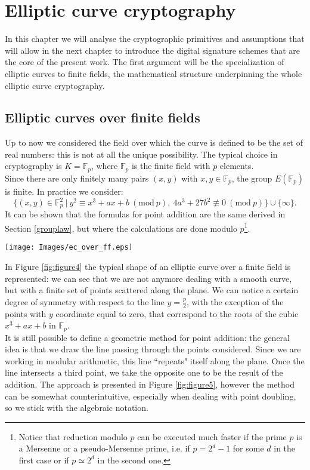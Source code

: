 \chapter{Elliptic curve cryptography}
\label{chpr:ecc}
In this chapter we will analyse the cryptographic primitives and assumptions that will allow in the next chapter to introduce the digital signature schemes that are the core of the present work. The first argument will be the specialization of elliptic curves to finite fields, the mathematical structure underpinning the whole elliptic curve cryptography.

\bigskip

\section{Elliptic curves over finite fields}
\label{ecoverff}
Up to now we considered the field over which the curve is defined to be the set of real numbers: this is not at all the unique possibility. The typical choice in cryptography is $K = \mathbb{F}_p$, where $\mathbb{F}_p$ is the finite field with $p$ elements. 
\\
Since there are only finitely many pairs $(x, y)$ with $x, y \in \mathbb{F}_p$, the group $E(\mathbb{F}_p)$ is finite.
In practice we consider: 
$$\{(x, y) \in \mathbb{F}_p^2 \ | \ y^2 \equiv x^3 + ax + b \ (\text{mod} \ p), \ 4a^3 + 27b^2 \not\equiv 0 \ (\text{mod} \ p)\} \cup \{\infty\}.$$
It can be shown that the formulas for point addition are the same derived in Section \ref{grouplaw}, but where the calculations are done modulo $p$\footnote{Notice that reduction modulo $p$ can be executed much faster if the prime $p$ is a Mersenne or a pseudo-Mersenne prime, i.e. if $p = 2^d - 1$ for some $d$ in the first case or if $p \simeq 2^d$ in the second one.}.
\\
\begin{center}
	\texttt{[image: Images/ec\_over\_ff.eps]}
	\label{fig:figure4}
\end{center}
In Figure \ref{fig:figure4} the typical shape of an elliptic curve over a finite field is represented: we can see that we are not anymore dealing with a smooth curve, but with a finite set of points scattered along the plane. We can notice a certain degree of symmetry with respect to the line $y = \frac{p}{2}$, with the exception of the points with $y$ coordinate equal to zero, that correspond to the roots of the cubic $x^3 + ax + b$ in $\mathbb{F}_p$.
\\
It is still possible to define a geometric method for point addition: the general idea is that we draw the line passing through the points considered. Since we are working in modular arithmetic, this line ``repeats" itself along the plane. Once the line intersects a third point, we take the opposite one to be the result of the addition. The approach is presented in Figure \ref{fig:figure5}, however the method can be somewhat counterintuitive, especially when dealing with point doubling, so we stick with the algebraic notation.


